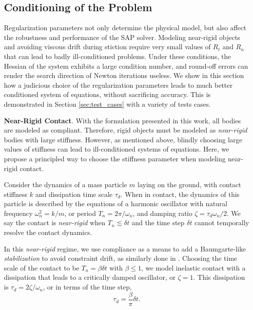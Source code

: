 
\subsection{Conditioning of the Problem}
\label{sec:conditioning}

Regularization parameters not only determine the physical model, but also affect
the robustness and performance of the SAP solver. Modeling near-rigid objects
and avoiding viscous drift during stiction require very small values of $R_t$
and $R_n$ that can lead to badly ill-conditioned problems. Under these
conditions, the Hessian of the system exhibits a large condition number, and
round-off errors can render the search direction of Newton iterations useless.
We show in this section how a judicious choice of the regularization parameters
leads to much better conditioned system of equations, without sacrificing
accuracy. This is demonstrated in Section \ref{sec:test_cases} with a variety of
tests cases.

\textbf{Near-Rigid Contact}. With the formulation presented in this work, all
bodies are modeled as compliant. Therefore, rigid objects must be modeled as
\emph{near-rigid} bodies with large stiffness. However, as mentioned above,
blindly choosing large values of stiffness can lead to ill-conditioned systems
of equations. Here, we propose a principled way to choose the stiffness
parameter when modeling near-rigid contact.

Consider the dynamics of a mass particle $m$ laying on the ground, with contact
stiffness $k$ and dissipation time scale $\tau_d$. When in contact, the dynamics
of this particle is described by the equations of a harmonic oscillator with
natural frequency $\omega_n^2 = k/m$, or period $T_n = 2\pi/\omega_n$, and
damping ratio $\zeta=\tau_d\omega_n/2$. We say the contact is \emph{near-rigid}
when $T_n \lesssim \delta t$ and the time step $\delta t$ cannot temporally
resolve the contact dynamics. 

In this \emph{near-rigid} regime, we use compliance as a means to add a
Baumgarte-like \emph{stabilization} to avoid constraint drift, as similarly done
in \cite{bib:todorov2011}. Choosing the time scale of the contact to be $T_n =
\beta \delta t$ with $\beta \le 1$, we model inelastic contact with a
dissipation that leads to a critically damped oscillator, or $\zeta=1$. This
dissipation is $\tau_d=2\zeta/\omega_n$, or in terms of the time step,
\begin{equation*}
    \tau_d=\frac{\beta}{\pi}\delta t.
\end{equation*}


